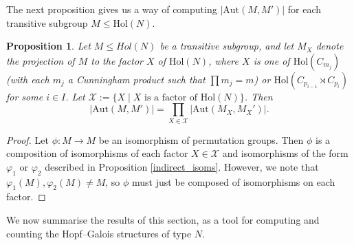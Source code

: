 \documentclass[a4paper,reqno]{amsart}
\newtheorem{proposition}[theorem]{Proposition}
\theoremstyle{definition}
\newcommand{\Aut}{\mathrm{Aut}}
\newcommand{\Hol}{\mathrm{Hol}}
\begin{document}
The next proposition gives us a way of computing $|\Aut(M,M')|$ for each transitive subgroup $M \leq \Hol(N)$.
\begin{proposition}\label{metab_cunningham_isoms}
    Let $M \leq Hol(N)$ be a transitive subgroup, and let $M_X$ denote the projection of $M$ to the factor $X$ of $\Hol(N)$, where $X$ is one of $\Hol(C_{m_j})$ (with each $m_j$ a Cunningham product such that $\prod m_j =m$) or $\Hol(C_{p_{i-1}} \rtimes C_{p_i})$ for some $i \in I$. Let $\mathcal{X}:=\{X \mid X \text{ is a factor of }\Hol(N)\}$. Then
    \[|\Aut(M,M')|=\prod_{X \in \mathcal{X}}|\Aut(M_X,M_X')|.\]
\end{proposition}
\begin{proof}
    Let $\phi:M \to M$ be an isomorphism of permutation groups. Then $\phi$ is a composition of isomorphisms of each factor $X \in \mathcal{X}$ and isomorphisms of the form $\varphi_1$ or $\varphi_2$ described in Proposition \ref{indirect_isoms}. However, we note that $\varphi_1(M),\varphi_2(M) \neq M$, so $\phi$ must just be composed of isomorphisms on each factor.
\end{proof}
We now summarise the results of this section, as a tool for computing and counting the Hopf--Galois structures of type $N$.
\end{document}
